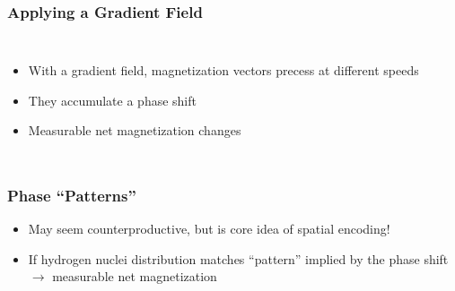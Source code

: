 \begin{frame}
	\frametitle{Applying a Gradient Field}
	
	\begin{columns}[onlytextwidth,c]
		\begin{itemize}
			\item With a gradient field, magnetization vectors precess at different speeds
			\item They accumulate a phase shift
			\item Measurable net magnetization changes
		\end{itemize}
	\end{columns}
	
	
	
	\begin{center}
		\begingroup
		
		\endgroup
	\end{center}
	
\end{frame}

\begin{frame}
	\frametitle{Phase ``Patterns''}
	
	\begin{itemize}
		\item May seem counterproductive, but is core idea of spatial encoding!
		
		\vspace{1ex}
		
		\item  If hydrogen nuclei distribution matches ``pattern'' implied by the phase shift $\rightarrow$ measurable net magnetization
	\end{itemize}
	
	\vspace{-2ex}
	
	\begin{center}
		\begingroup
		
		\endgroup
	\end{center}
\end{frame}

